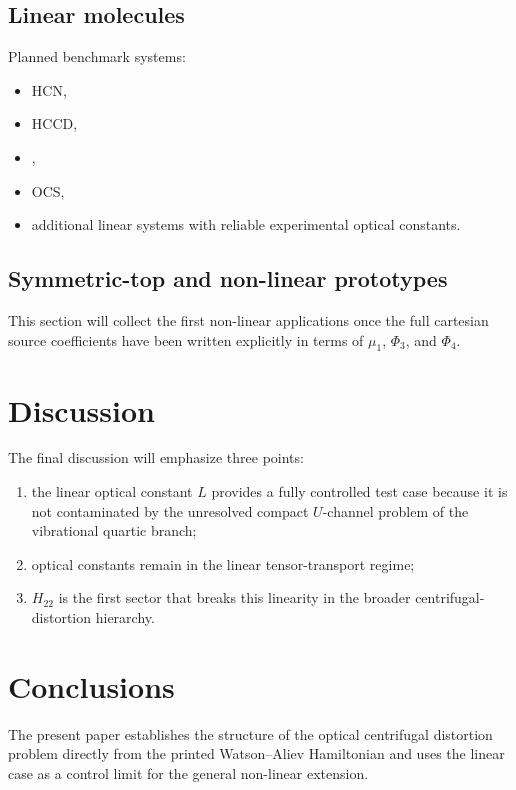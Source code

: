 \documentclass[aip,jcp,reprint,floatfix]{revtex4-2}
\begin{document}
\subsection{Linear molecules}

Planned benchmark systems:
\begin{itemize}
\item HCN,
\item HCCD,
\item {},
\item OCS,
\item additional linear systems with reliable experimental optical constants.
\end{itemize}

\subsection{Symmetric-top and non-linear prototypes}

This section will collect the first non-linear applications once the full
cartesian source coefficients have been written explicitly in terms of
\(\mu_1\), \(\Phi_3\), and \(\Phi_4\).

\section{Discussion}

The final discussion will emphasize three points:
\begin{enumerate}
\item the linear optical constant \(L\) provides a fully controlled test case
because it is not contaminated by the unresolved compact \(U\)-channel problem
of the vibrational quartic branch;
\item optical constants remain in the linear tensor-transport regime;
\item \(H_{22}\) is the first sector that breaks this linearity in the broader
centrifugal-distortion hierarchy.
\end{enumerate}

\section{Conclusions}

The present paper establishes the structure of the optical centrifugal
distortion problem directly from the printed Watson--Aliev Hamiltonian and uses
the linear case as a control limit for the general non-linear extension.


\end{document}
